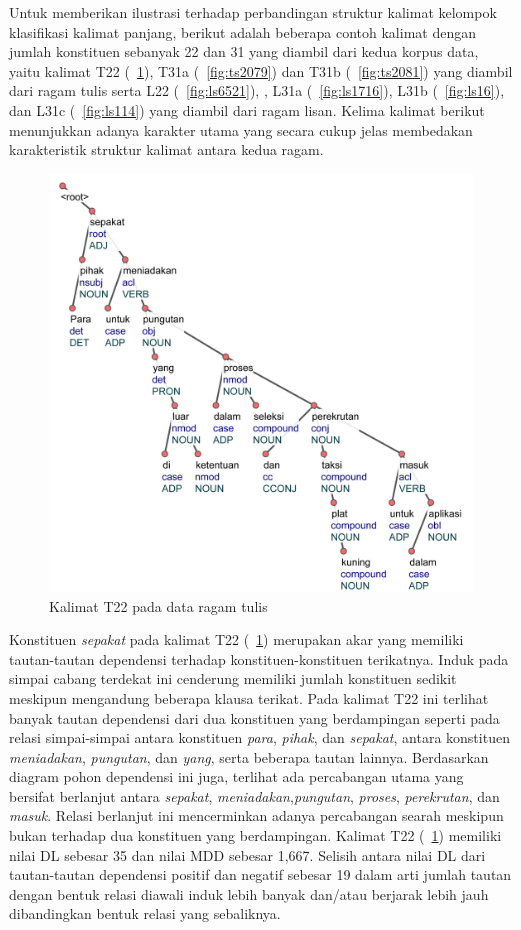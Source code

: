 Untuk memberikan ilustrasi terhadap perbandingan struktur kalimat kelompok klasifikasi kalimat panjang, berikut adalah beberapa contoh kalimat dengan jumlah konstituen sebanyak 22 dan 31 yang diambil dari kedua korpus data, yaitu kalimat T22 (\pic~\ref{fig:ts3901}), T31a (\pic~\ref{fig:ts2079}) dan T31b (\pic~\ref{fig:ts2081}) yang diambil dari ragam tulis serta L22 (\pic~\ref{fig:ls6521}), , L31a (\pic~\ref{fig:ls1716}), L31b (\pic~\ref{fig:ls16}), dan L31c (\pic~\ref{fig:ls114}) yang diambil dari ragam lisan. Kelima kalimat berikut menunjukkan adanya karakter utama yang secara cukup jelas membedakan karakteristik struktur kalimat antara kedua ragam. 

\begin{figure}
	\centering \includegraphics[width=0.8
	\textwidth] {pics/ts3901.jpg} 
	\caption{Kalimat T22 pada data ragam tulis} 
	\label{fig:ts3901} 
\end{figure}

Konstituen \textit{sepakat} pada kalimat T22 (\pic~\ref{fig:ts3901}) merupakan akar yang memiliki tautan-tautan dependensi terhadap konstituen-konstituen terikatnya. Induk pada simpai cabang terdekat ini cenderung memiliki jumlah konstituen sedikit meskipun mengandung beberapa klausa terikat. Pada kalimat T22 ini terlihat banyak tautan dependensi dari dua konstituen yang berdampingan seperti pada relasi simpai-simpai antara konstituen \textit{para}, \textit{pihak}, dan \textit{sepakat}, antara konstituen \textit{meniadakan}, \textit{pungutan}, dan \textit{yang}, serta beberapa tautan lainnya. Berdasarkan diagram pohon dependensi ini juga, terlihat ada percabangan utama yang bersifat berlanjut antara \textit{sepakat}, \textit{meniadakan},\textit{pungutan}, \textit{proses}, \textit{perekrutan}, dan \textit{masuk}. Relasi berlanjut ini mencerminkan adanya percabangan searah meskipun bukan terhadap dua konstituen yang berdampingan. Kalimat T22 (\pic~\ref{fig:ts3901}) memiliki nilai DL sebesar 35 dan nilai MDD sebesar 1,667. Selisih antara nilai DL dari tautan-tautan dependensi positif dan negatif sebesar 19 dalam arti jumlah tautan dengan bentuk relasi diawali induk lebih banyak dan/atau berjarak lebih jauh dibandingkan bentuk relasi yang sebaliknya.


